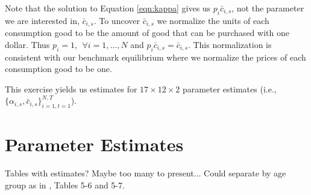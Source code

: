 \documentclass[article,11pt,letterpaper,fleqn]{article}
\theoremstyle{definition}
\numberwithin{equation}{section}
\newcommand{\cn}{\citeasnoun} %
\begin{document}
Note that the solution to Equation \ref{eqn:kappa} gives us $p_{i}\bar{c}_{i,s}$, not the parameter we are interested in, $\bar{c}_{i,s}$.  To uncover $\bar{c}_{i,s}$ we normalize the units of each consumption good to be the amount of good that can be purchased with one dollar.  Thus $p_{i}=1, \ \ \forall i=1,...,N$ and $p_{i}\bar{c}_{i,s}=\bar{c}_{i,s}$.  This normalization is consistent with our benchmark equilibrium where we normalize the prices of each consumption good to be one.

This exercise yields us estimates for $17\times12\times2$ parameter estimates (i.e., $\{\alpha_{i,s},\bar{c}_{i,s}\}_{i=1,t=1}^{N,T}$).






\section{Parameter Estimates}

Tables with estimates?  Maybe too many to present...  Could separate by age group as in \cn{FR1993}, Tables 5-6 and 5-7.
\end{document}
